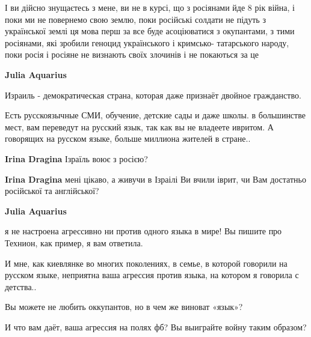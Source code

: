 \begin{itemize}
\begin{itemize}
І ви дійсно знущаєтесь з мене, ви не в курсі, що з росіянами
йде 8 рік війна, і поки ми не повернемо свою землю, поки російські солдати не
підуть з української землі ця мова перш за все буде асоціюватися з окупантами,
з тими росіянами, які зробили геноцид українського і кримсько- татарського
народу, поки росія і росіяне не визнають своїх злочинів і не покаються за це


 
\textbf{Julia Aquarius} 

Израиль - демократическая страна, которая даже признаёт двойное гражданство.

Есть русскоязычные СМИ, обучение, детские сады и даже школы. в большинстве
мест, вам переведут на русский язык, так как вы не владеете ивритом. А
говорящих на русском языке, больше миллиона жителей в стране..

 
\textbf{Irina Dragina} Ізраїль воює з росією?

 
\textbf{Irina Dragina} мені цікаво, а живучи в Ізраілі Ви вчили іврит, чи Вам достатньо російської та англійської?


\textbf{Julia Aquarius} 

я не настроена агрессивно ни против одного языка в мире! Вы пишите про Технион,
как пример, я вам ответила.

И мне, как киевлянке во многих поколениях, в семье, в которой говорили на
русском языке, неприятна ваша агрессия против языка, на котором я говорила с
детства..

Вы можете не любить оккупантов, но в чем же виноват «язык»?

И что вам даёт, ваша агрессия на полях фб? Вы выиграйте войну таким образом?


\end{itemize}
\end{itemize}
